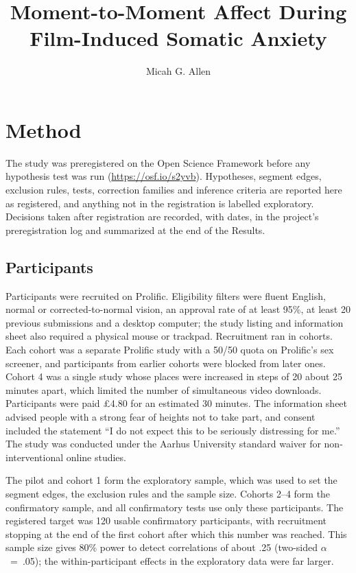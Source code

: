 \documentclass[man,floatsintext,12pt,donotrepeattitle]{apa7}
\title{Moment-to-Moment Affect During Film-Induced Somatic Anxiety}
\author{Micah G. Allen}
\affiliation{Center of Functionally Integrative Neuroscience, Aarhus University}
\begin{document}
\maketitle

\section{Method}

The study was preregistered on the Open Science Framework before any hypothesis test was run
(\url{https://osf.io/s2yvb}). Hypotheses, segment edges, exclusion rules, tests, correction families and inference
criteria are reported here as registered, and anything not in the registration is labelled exploratory. Decisions
taken after registration are recorded, with dates, in the project's preregistration log and summarized at the end of
the Results.

\subsection{Participants}

Participants were recruited on Prolific. Eligibility filters were fluent English, normal or corrected-to-normal
vision, an approval rate of at least 95\%, at least 20 previous submissions and a desktop computer; the study listing
and information sheet also required a physical mouse or trackpad. Recruitment ran in cohorts. Each cohort was a
separate Prolific study with a 50/50 quota on Prolific's sex screener, and participants from earlier cohorts were
blocked from later ones. Cohort 4 was a single study whose places were increased in steps of 20 about 25 minutes
apart, which limited the number of simultaneous video downloads. Participants were paid \pounds 4.80 for an estimated
30 minutes. The information sheet advised people with a strong fear of heights not to take part, and consent included
the statement \enquote{I do not expect this to be seriously distressing for me.} The study was conducted under the
Aarhus University standard waiver for non-interventional online studies.

The pilot and cohort 1 form the exploratory sample, which was used to set the segment edges, the exclusion rules and
the sample size. Cohorts 2--4 form the confirmatory sample, and all confirmatory tests use only these participants.
The registered target was 120 usable confirmatory participants, with recruitment stopping at the end of the first
cohort after which this number was reached. This sample size gives 80\% power to detect correlations of about .25
(two-sided $\alpha$~=~.05); the within-participant effects in the exploratory data were far larger.
\end{document}
